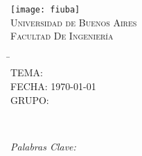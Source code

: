 \begin{titlepage}
	
		\thispagestyle{empty}

		\begin{center}
			\texttt{[image: fiuba]}\\
			\large{\textsc{Universidad de Buenos Aires}}\\
			\large{\textsc{Facultad De Ingeniería}}\\
			\small{\myTimePeriod}
		\end{center}

		\vfill

		\begin{center}
			\Large{\underline{\textsc{\mySubject}}}
		\end{center}

		\vfill

		\begin{tabbing}
			\hspace{2cm}\=\+\myTitle\\
				TEMA: \mySubtitle\\
				FECHA: \today\\
				\ifPutgroup
				GRUPO: \texttt{\myGroupNumber}\\
				\fi

			\\
				\MembersHeader
				\MembersOnCover	
		\end{tabbing}

%			

	\ifKeywords
		\begin{center}
			\emph{Palabras Clave: \myKeywords}
		\end{center}
	\fi	

		\vfill
	
\end{titlepage}



